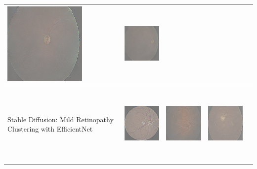 \begin{table}[H]
\begin{tabularx}{\linewidth}{@{}>{\centering\arraybackslash}m{3cm}>{\centering\arraybackslash}X>{\centering\arraybackslash}X>{\centering\arraybackslash}X>{\centering\arraybackslash}X@{}}
\includegraphics[valign=M,width=\linewidth,height=4cm,keepaspectratio]{main/content/images/retinopatia_dreambooth_comparison/synthetic/134.png} & 
\includegraphics[valign=M,width=\linewidth,height=4cm,keepaspectratio]{main/content/images/retinopatia_dreambooth_comparison/synthetic/90.png} \\
\midrule
Stable Diffusion: Mild Retinopathy Clustering with EfficientNet &
\includegraphics[valign=M,width=\linewidth,height=4cm,keepaspectratio]{main/content/images/retinopatia_dreambooth_comparison/cluster/cluster_3_image1.png} & 
\includegraphics[valign=M,width=\linewidth,height=4cm,keepaspectratio]{main/content/images/retinopatia_dreambooth_comparison/cluster/cluster_6_image10.png} & 
\includegraphics[valign=M,width=\linewidth,height=4cm,keepaspectratio]{main/content/images/retinopatia_dreambooth_comparison/cluster/cluster_8_image6.png} \\

\end{tabularx}
\end{table}
